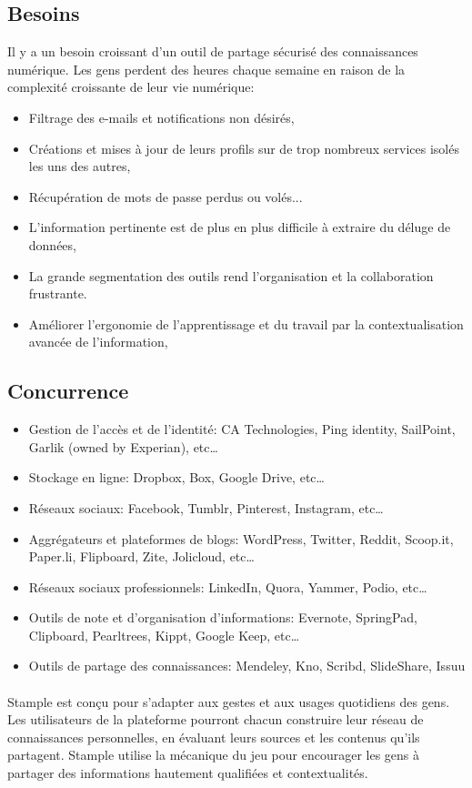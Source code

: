 \documentclass[12pt,oneside,a4paper]{article}
\begin{document}
\subsection{Besoins}
Il y a un besoin croissant d'un outil de partage sécurisé des connaissances numérique. Les gens perdent des heures chaque semaine en raison de la complexité croissante de leur vie numérique:
\begin{itemize}
\item Filtrage des e-mails et notifications non désirés,
\item Créations et mises à jour de leurs profils sur de trop nombreux services isolés les uns des autres,
\item Récupération de mots de passe perdus ou volés...
\item L'information pertinente est de plus en plus difficile à extraire du déluge de données,
\item La grande segmentation des outils rend l'organisation et la collaboration frustrante.
\item Améliorer l'ergonomie de l'apprentissage et du travail par la contextualisation avancée de l'information,

\end{itemize}
\subsection{Concurrence}
\begin{itemize}
\item Gestion de l'accès et de l'identité: CA Technologies, Ping identity, SailPoint, Garlik (owned by Experian), etc…
\item Stockage en ligne: Dropbox, Box, Google Drive, etc…
\item Réseaux sociaux: Facebook, Tumblr, Pinterest, Instagram, etc…
\item Aggrégateurs et plateformes de blogs: WordPress, Twitter, Reddit, Scoop.it, Paper.li, Flipboard, Zite, Jolicloud, etc…
\item Réseaux sociaux professionnels: LinkedIn, Quora, Yammer, Podio, etc…
\item Outils de note et d'organisation d'informations: Evernote, SpringPad, Clipboard, Pearltrees, Kippt, Google Keep, etc…
\item Outils de partage des connaissances: Mendeley, Kno, Scribd, SlideShare, Issuu

\end{itemize}
\paragraph{}
Stample est conçu pour s'adapter aux gestes et aux usages quotidiens des gens. Les utilisateurs de la plateforme pourront chacun construire leur réseau de connaissances personnelles, en évaluant leurs sources et les contenus qu'ils partagent.
Stample utilise la mécanique du jeu pour encourager les gens à partager des informations hautement qualifiées et contextualités.
\end{document}
